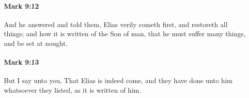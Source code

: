 		\paragraph{Mark 9:12} %
			\label{MARK-9-12}

			And he answered and told them, Elias verily cometh first, and restoreth all things; and how it is written of the Son of man, that he must suffer many things, and be set at nought.

			\begin{framed}
			\scriptsize
				\begin{compactdesc}
					\item[SBLG] 
				\end{compactdesc}
			\end{framed}

		\paragraph{Mark 9:13} %
			\label{MARK-9-13}

			But I say unto you, That Elias is indeed come, and they have done unto him whatsoever they listed, as it is written of him.

